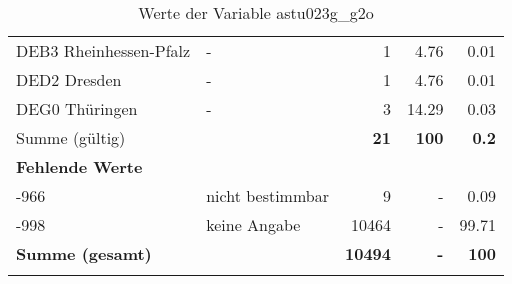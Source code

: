 \begin{longtable}{Xlrrr}
     \multicolumn{1}{X}{DEB3 Rheinhessen-Pfalz} &
     - &
     \num{1} &
     \num[round-mode=places,round-precision=2]{4.76} &
     \num[round-mode=places,round-precision=2]{0.01} \\

     \multicolumn{1}{X}{DED2 Dresden} &
     - &
     \num{1} &
     \num[round-mode=places,round-precision=2]{4.76} &
     \num[round-mode=places,round-precision=2]{0.01} \\

     \multicolumn{1}{X}{DEG0 Thüringen} &
     - &
     \num{3} &
     \num[round-mode=places,round-precision=2]{14.29} &
     \num[round-mode=places,round-precision=2]{0.03} \\
     \midrule
      \multicolumn{2}{l}{Summe (gültig)} & \textbf{\num{21}} &
      \textbf{\num{100}} &
         \textbf{\num[round-mode=places,round-precision=2]{0.2}} \\
     \multicolumn{5}{l}{\textbf{Fehlende Werte}}\\
       -966 & nicht bestimmbar & \num{9} & - & \num[round-mode=places,round-precision=2]{0.09} \\

       -998 & keine Angabe & \num{10464} & - & \num[round-mode=places,round-precision=2]{99.71} \\

     \midrule
     \multicolumn{2}{l}{\textbf{Summe (gesamt)}} & \textbf{\num{10494}} & \textbf{-} & \textbf{\num{100}} \\
     \bottomrule
     \caption{Werte der Variable astu023g\_g2o}
     \end{longtable}
     
